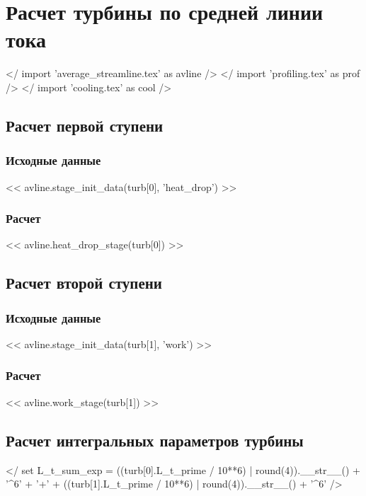 \documentclass[a4paper,10pt]{article}
\begin{document}
    \section{Расчет турбины по средней линии тока}

    </ import 'average_streamline.tex' as avline />
    </ import 'profiling.tex' as prof />
    </ import 'cooling.tex' as cool />

    \subsection{Расчет первой ступени}

    \subsubsection{Исходные данные}

    << avline.stage_init_data(turb[0], 'heat_drop') >>

    \subsubsection{Расчет}

    << avline.heat_drop_stage(turb[0]) >>

    \subsection{Расчет второй ступени}

    \subsubsection{Исходные данные}

    << avline.stage_init_data(turb[1], 'work') >>

    \subsubsection{Расчет}

    << avline.work_stage(turb[1]) >>

    \subsection{Расчет интегральных параметров турбины}

    </ set L_t_sum_exp = ((turb[0].L_t_prime / 10**6) | round(4)).__str__() + '^6' + '+' +
        ((turb[1].L_t_prime / 10**6) | round(4)).__str__() + '^6' />
\end{document}
